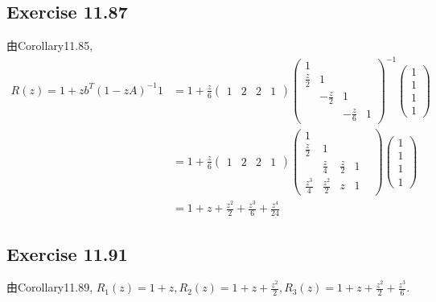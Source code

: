 \documentclass[UTF8]{ctexart}
\begin{document}
\subsection*{Exercise 11.87}
由Corollary11.85, 
\begin{equation}
    \begin{aligned}
        R(z) = 1 + zb^T(1-zA)^{-1}1 &= 1 + \frac{z}{6}
        \begin{pmatrix}
            1 & 2 & 2 & 1
        \end{pmatrix}
        \begin{pmatrix}
            1 & & & \\ \frac{z}{2} & 1 & & \\ & -\frac{z}{2} & 1 & \\ & & -\frac{z}{6} & 1
        \end{pmatrix}^{-1}
        \begin{pmatrix}
            1 \\ 1 \\ 1 \\ 1
        \end{pmatrix} \\
        &= 1 + \frac{z}{6}
        \begin{pmatrix}
            1 & 2 & 2 & 1
        \end{pmatrix}
        \begin{pmatrix}
            1 & & & \\ \frac{z}{2} & 1 & & \\ & \frac{z}{4} & \frac{z}{2} & 1 & \\ \frac{z^3}{4} & \frac{z^2}{2} & z & 1 
        \end{pmatrix}
        \begin{pmatrix}
            1 \\ 1 \\ 1 \\ 1
        \end{pmatrix} \\
        &= 1 + z + \frac{z^2}{2} + \frac{z^3}{6} + \frac{z^4}{24}
    \end{aligned}
\end{equation}

\subsection*{Exercise 11.91}
由Corollary11.89, $R_1(z) = 1 + z, R_2(z) = 1 + z + \frac{z^2}{2}, R_3(z) = 1 + z + \frac{z^2}{2} + \frac{z^3}{6}.$
\end{document}

